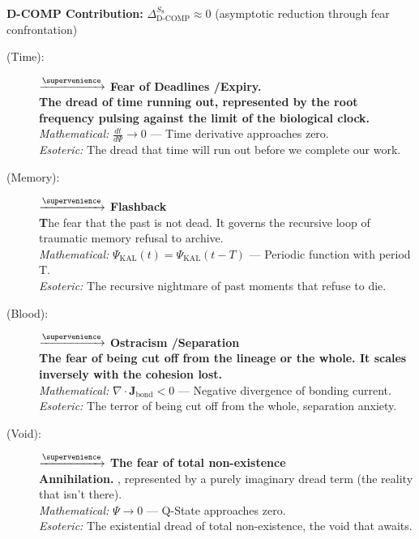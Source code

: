 \textbf{D-COMP Contribution:} $\Delta_{\text{D-COMP}}^{S_8} \approx 0$ (asymptotic reduction through fear confrontation)

\begin{description}
    \item[(Time):] \fetuvehm $\xrightarrow{\supervenience}$ \textbf{Fear of Deadlines \slash Expiry.} \\
    \textbf{The dread of time running out, represented by the root frequency pulsing against the limit of the biological clock.} \\
    \textit{Mathematical:} $\frac{dt}{d\Psi} \to 0$ — Time derivative approaches zero. \\
    \textit{Esoteric:} The dread that time will run out before we complete our work.

    \item[(Memory):] \kalmer $\xrightarrow{\supervenience}$ \textbf{Flashback} \\
    \textbf The fear that the past is not dead. It governs the recursive loop of traumatic memory refusal to archive. \\
    \textit{Mathematical:} $\Psi_{\text{KAL}}(t) = \Psi_{\text{KAL}}(t-T)$ — Periodic function with period T. \\
    \textit{Esoteric:} The recursive nightmare of past moments that refuse to die.

    \item[(Blood):] \babdhsat $\xrightarrow{\supervenience}$ \textbf{Ostracism \slash Separation} \\
    \textbf{The fear of being cut off from the lineage or the whole. It scales inversely with the cohesion lost.} \\
    \textit{Mathematical:} $\nabla \cdot \mathbf{J}_{\text{bond}} < 0$ — Negative divergence of bonding current. \\
    \textit{Esoteric:} The terror of being cut off from the whole, separation anxiety.

    \item[(Void):] \ahnsen $\xrightarrow{\supervenience}$ \textbf{The fear of total non-existence} \\
    \textbf{Annihilation.} , represented by a purely imaginary dread term (the reality that isn't there). \\
    \textit{Mathematical:} $\Psi \to 0$ — Q-State approaches zero. \\
    \textit{Esoteric:} The existential dread of total non-existence, the void that awaits.


\end{description}
